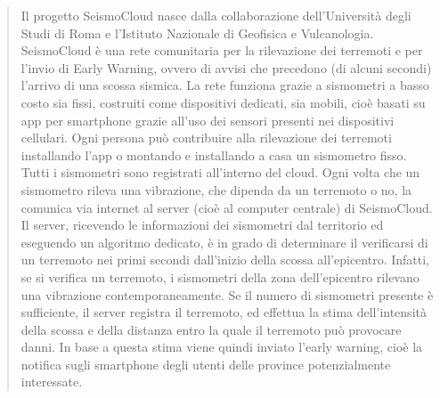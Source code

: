 \documentclass[main.tex]{subfiles}
\begin{document}
\begin{quote}
Il progetto SeismoCloud\cite{SeismoCloud} nasce dalla collaborazione dell’Università 
 degli Studi di Roma  e l’Istituto Nazionale di Geofisica e Vulcanologia. SeismoCloud è una rete comunitaria per la rilevazione dei terremoti e per l’invio di Early Warning, ovvero di avvisi che precedono (di alcuni secondi) l’arrivo di una scossa sismica. La rete funziona grazie a sismometri a basso costo sia fissi, costruiti come dispositivi dedicati, sia mobili, cioè basati su app per smartphone grazie all’uso dei sensori presenti nei dispositivi cellulari. 
Ogni persona può contribuire alla rilevazione dei terremoti installando l’app o montando e installando a casa un sismometro fisso. Tutti i sismometri sono registrati all’interno del cloud. Ogni volta che un sismometro rileva una vibrazione, che dipenda da un terremoto o no, la comunica via internet al server (cioè al computer centrale) di SeismoCloud. \newline
Il server, ricevendo le informazioni dei sismometri dal territorio ed eseguendo un algoritmo dedicato, è in grado di determinare il verificarsi di un terremoto nei primi secondi dall’inizio della scossa all’epicentro. Infatti, se si verifica un terremoto, i sismometri della zona dell’epicentro rilevano una vibrazione contemporaneamente. Se il numero di sismometri presente è sufficiente, il server registra il terremoto, ed effettua la stima dell’intensità della scossa e della distanza entro la quale il terremoto può provocare danni. In base a questa stima viene quindi inviato l’early warning, cioè la notifica sugli smartphone degli utenti delle province potenzialmente interessate.
\end{quote}
\end{document}
